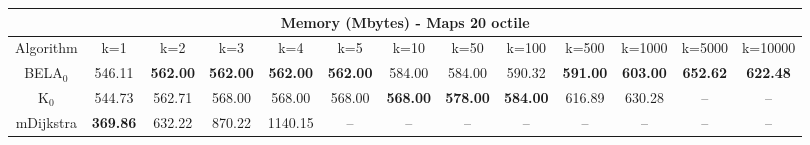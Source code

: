 \begin{tabular}{c|cccccccccccc}\toprule
\multicolumn{13}{c}{Memory (Mbytes) - Maps 20 octile}\\ \midrule
Algorithm & k=1 & k=2 & k=3 & k=4 & k=5 & k=10 & k=50 & k=100 & k=500 & k=1000 & k=5000 & k=10000 \\ \midrule
BELA$_0$ & 546.11 & \textbf{562.00} & \textbf{562.00} & \textbf{562.00} & \textbf{562.00} & 584.00 & 584.00 & 590.32 & \textbf{591.00} & \textbf{603.00} & \textbf{652.62} & \textbf{622.48} \\
K$_0$ & 544.73 & 562.71 & 568.00 & 568.00 & 568.00 & \textbf{568.00} & \textbf{578.00} & \textbf{584.00} & 616.89 & 630.28 & -- & -- \\
mDijkstra & \textbf{369.86} & 632.22 & 870.22 & 1140.15 & -- & -- & -- & -- & -- & -- & -- & -- \\ \bottomrule 
\end{tabular}
